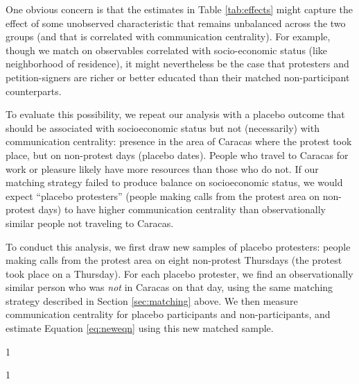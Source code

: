 \documentclass[12pt]{article}
\newcommand{\jop}{0} %
\begin{document}
One obvious concern is that the estimates in Table \ref{tab:effects} might capture the effect of some unobserved characteristic that remains unbalanced across the two groups (and that is correlated with communication centrality). For example, though we match on observables correlated with socio-economic status (like neighborhood of residence), it might nevertheless be the case that protesters and petition-signers are richer or better educated than their matched non-participant counterparts.

To evaluate this possibility, we repeat our analysis with a placebo outcome that should be associated with socioeconomic status but not (necessarily) with communication centrality: presence in the area of Caracas where the protest took place, but on non-protest days (placebo dates). People who travel to Caracas for work or pleasure likely have more resources than those who do not. If our matching strategy failed to produce balance on socioeconomic status, we would expect ``placebo protesters'' (people making calls from the protest area on non-protest days) to have higher communication centrality than observationally similar people not traveling to Caracas.

To conduct this analysis, we first draw new samples of placebo protesters: people making calls from the protest area on eight non-protest Thursdays (the protest took place on a Thursday). For each placebo protester, we find an observationally similar person who was \emph{not} in Caracas on that day, using the same matching strategy described in Section \ref{sec:matching} above. We then measure communication centrality for placebo participants and non-participants, and estimate Equation \ref{eq:neweqn} using this new matched sample.



	\if\jop1
	\linespread{1}\selectfont
	\fi

	

	\if\jop1
	\linespread{2}\selectfont
	\vspace{-0.5cm}
	\fi

\end{document}
